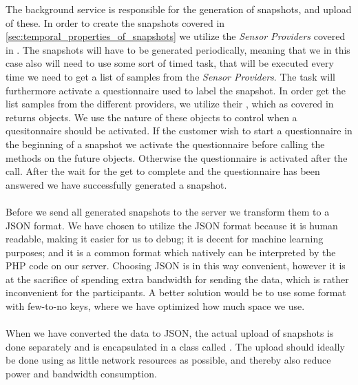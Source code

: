 The background service is responsible for the generation of snapshots, and upload of these. In order to create the snapshots covered in \ref{sec:temporal_properties_of_snapshots} we utilize the \emph{Sensor Providers} covered in . The snapshots will have to be generated periodically, meaning that we in this case also will need to use some sort of timed task, that will be executed every time we need to get a list of samples from the \emph{Sensor Providers}. The task will furthermore activate a questionnaire used to label the snapshot. In order get the list samples from the different providers, we utilize their , which as covered in  returns  objects. We use the nature of these objects to control when a quesitonnaire should be activated. If the customer wish to start a questionnaire in the beginning of a snapshot we activate the questionnaire before calling the  methods on the future objects. Otherwise the questionnaire is activated after the call. After the wait for the get to complete and the questionnaire has been answered we have successfully generated a snapshot.
\\\\
Before we send all generated snapshots to the server we transform them to a JSON format. We have chosen to utilize the JSON format because it is human readable, making it easier for us to debug; it is decent for machine learning purposes; and it is a common format which natively can be interpreted by the PHP code on our server. Choosing JSON is in this way convenient, however it is at the sacrifice of spending extra bandwidth for sending the data, which is rather inconvenient for the participants. A better solution would be to use some format with few-to-no keys, where we have optimized how much space we use. 
\\\\
When we have converted the data to JSON, the actual upload of snapshots is done separately and is encapsulated in a class called . The upload should ideally be done using as little network resources as possible, and thereby also reduce power and bandwidth consumption. 
\\\\


